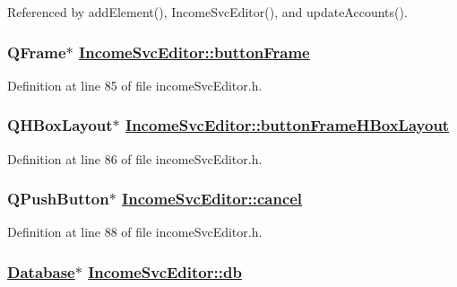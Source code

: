 Referenced by add\-Element(), Income\-Svc\-Editor(), and update\-Accounts().\hypertarget{classIncomeSvcEditor_r28}{
\subsubsection[buttonFrame]{\setlength{\rightskip}{0pt plus 5cm}QFrame$\ast$ \hyperlink{classIncomeSvcEditor_r28}{Income\-Svc\-Editor::button\-Frame}}}
\label{classIncomeSvcEditor_r28}


Definition at line 85 of file income\-Svc\-Editor.h.\hypertarget{classIncomeSvcEditor_r29}{
\subsubsection[buttonFrameHBoxLayout]{\setlength{\rightskip}{0pt plus 5cm}QHBox\-Layout$\ast$ \hyperlink{classIncomeSvcEditor_r29}{Income\-Svc\-Editor::button\-Frame\-HBox\-Layout}}}
\label{classIncomeSvcEditor_r29}


Definition at line 86 of file income\-Svc\-Editor.h.\hypertarget{classIncomeSvcEditor_r31}{
\subsubsection[cancel]{\setlength{\rightskip}{0pt plus 5cm}QPush\-Button$\ast$ \hyperlink{classIncomeSvcEditor_r31}{Income\-Svc\-Editor::cancel}}}
\label{classIncomeSvcEditor_r31}


Definition at line 88 of file income\-Svc\-Editor.h.\hypertarget{classIncomeSvcEditor_r0}{
\subsubsection[db]{\setlength{\rightskip}{0pt plus 5cm}\hyperlink{classDatabase}{Database}$\ast$ \hyperlink{classIncomeSvcEditor_r0}{Income\-Svc\-Editor::db}}}
\label{classIncomeSvcEditor_r0}


